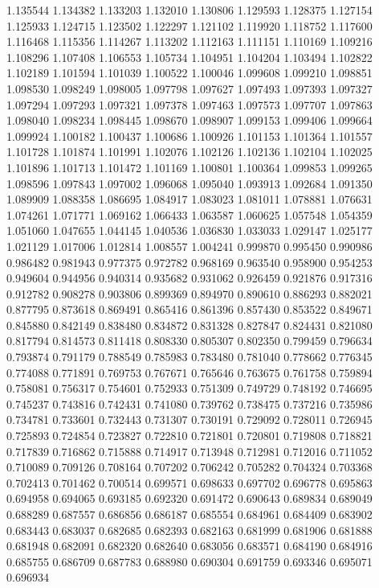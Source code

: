 1.135544
1.134382
1.133203
1.132010
1.130806
1.129593
1.128375
1.127154
1.125933
1.124715
1.123502
1.122297
1.121102
1.119920
1.118752
1.117600
1.116468
1.115356
1.114267
1.113202
1.112163
1.111151
1.110169
1.109216
1.108296
1.107408
1.106553
1.105734
1.104951
1.104204
1.103494
1.102822
1.102189
1.101594
1.101039
1.100522
1.100046
1.099608
1.099210
1.098851
1.098530
1.098249
1.098005
1.097798
1.097627
1.097493
1.097393
1.097327
1.097294
1.097293
1.097321
1.097378
1.097463
1.097573
1.097707
1.097863
1.098040
1.098234
1.098445
1.098670
1.098907
1.099153
1.099406
1.099664
1.099924
1.100182
1.100437
1.100686
1.100926
1.101153
1.101364
1.101557
1.101728
1.101874
1.101991
1.102076
1.102126
1.102136
1.102104
1.102025
1.101896
1.101713
1.101472
1.101169
1.100801
1.100364
1.099853
1.099265
1.098596
1.097843
1.097002
1.096068
1.095040
1.093913
1.092684
1.091350
1.089909
1.088358
1.086695
1.084917
1.083023
1.081011
1.078881
1.076631
1.074261
1.071771
1.069162
1.066433
1.063587
1.060625
1.057548
1.054359
1.051060
1.047655
1.044145
1.040536
1.036830
1.033033
1.029147
1.025177
1.021129
1.017006
1.012814
1.008557
1.004241
0.999870
0.995450
0.990986
0.986482
0.981943
0.977375
0.972782
0.968169
0.963540
0.958900
0.954253
0.949604
0.944956
0.940314
0.935682
0.931062
0.926459
0.921876
0.917316
0.912782
0.908278
0.903806
0.899369
0.894970
0.890610
0.886293
0.882021
0.877795
0.873618
0.869491
0.865416
0.861396
0.857430
0.853522
0.849671
0.845880
0.842149
0.838480
0.834872
0.831328
0.827847
0.824431
0.821080
0.817794
0.814573
0.811418
0.808330
0.805307
0.802350
0.799459
0.796634
0.793874
0.791179
0.788549
0.785983
0.783480
0.781040
0.778662
0.776345
0.774088
0.771891
0.769753
0.767671
0.765646
0.763675
0.761758
0.759894
0.758081
0.756317
0.754601
0.752933
0.751309
0.749729
0.748192
0.746695
0.745237
0.743816
0.742431
0.741080
0.739762
0.738475
0.737216
0.735986
0.734781
0.733601
0.732443
0.731307
0.730191
0.729092
0.728011
0.726945
0.725893
0.724854
0.723827
0.722810
0.721801
0.720801
0.719808
0.718821
0.717839
0.716862
0.715888
0.714917
0.713948
0.712981
0.712016
0.711052
0.710089
0.709126
0.708164
0.707202
0.706242
0.705282
0.704324
0.703368
0.702413
0.701462
0.700514
0.699571
0.698633
0.697702
0.696778
0.695863
0.694958
0.694065
0.693185
0.692320
0.691472
0.690643
0.689834
0.689049
0.688289
0.687557
0.686856
0.686187
0.685554
0.684961
0.684409
0.683902
0.683443
0.683037
0.682685
0.682393
0.682163
0.681999
0.681906
0.681888
0.681948
0.682091
0.682320
0.682640
0.683056
0.683571
0.684190
0.684916
0.685755
0.686709
0.687783
0.688980
0.690304
0.691759
0.693346
0.695071
0.696934

